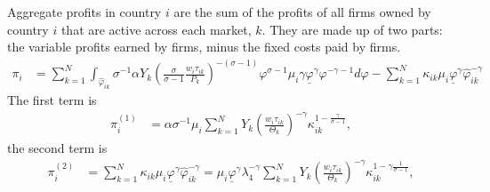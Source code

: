 \documentclass[11pt, pdftex]{article}
\begin{document}
Aggregate profits in country $i$ are the sum of the profits of all firms owned by country $i$ that are active across each market, $k$.  They are made up of two parts: the variable profits earned by firms, minus the fixed costs paid by firms.
\begin{align} \label{eq:aggprofit}
  \pi_i& = \sum_{k=1}^N \int_{\hat{\varphi}_{ik}} \sigma^{-1}\alpha Y_k \left(\frac{\sigma}{\sigma-1}\frac{w_i\tau_{ik}}{P_k}\right)^{-(\sigma-1)} \varphi^{\sigma-1}\mu_i\gamma\underline{\varphi}^\gamma \varphi^{-\gamma-1}d\varphi - \sum_{k=1}^N\kappa_{ik}\mu_i\underline{\varphi}^\gamma \hat{\varphi}_{ik}^{-\gamma}
\end{align}
The first term is
\begin{align}
     \pi_i^{(1)}& = \alpha\sigma^{-1}\mu_i
     \sum_{k=1}^N Y_k \left(\frac{w_i\tau_{ik}}{\Theta_k}\right)^{-\gamma} \kappa_{ik}^{1-\frac{\gamma}{\sigma-1}},
\end{align}
the second term is
\begin{align}
   \pi^{(2)}_i&=\sum_{k=1}^N\kappa_{ik}\mu_i\underline{\varphi}^\gamma \hat{\varphi}_{ik}^{-\gamma}=\mu_i\underline{\varphi}^\gamma \lambda_4^{-\gamma}\sum_{k=1}^NY_k \left(\frac{w_i\tau_{ik}}{\Theta_k}\right)^{-\gamma}  \kappa_{ik}^{1-\gamma\frac{1}{\sigma-1}},
\end{align}
\end{document}
